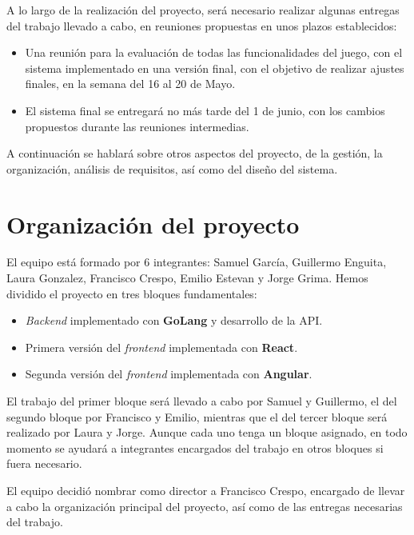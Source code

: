 \documentclass[11pt, a4paper, titlepage]{article}
\begin{document}
A lo largo de la realización del proyecto, será necesario realizar algunas entregas del trabajo llevado a cabo, en reuniones propuestas en unos plazos establecidos:

\begin{itemize}
    \item Una reunión para la evaluación de todas las funcionalidades del juego, con el sistema implementado en una versión final, con el objetivo de realizar ajustes finales, en la semana del 16 al 20 de Mayo.
    \item El sistema final se entregará no más tarde del 1 de junio, con los cambios propuestos durante las reuniones intermedias.
\end{itemize}

A continuación se hablará sobre otros aspectos del proyecto, de la gestión, la organización, análisis de requisitos, así como del diseño del sistema.

\section{Organización del proyecto}
El equipo está formado por 6 integrantes: Samuel García, Guillermo Enguita, Laura Gonzalez, Francisco Crespo, Emilio Estevan y Jorge Grima.
Hemos dividido el proyecto en tres bloques fundamentales:\newline
\begin{itemize}
    \item \textit{Backend} implementado con \textbf{GoLang} y desarrollo de la API.
    \item Primera versión del \textit{frontend} implementada con \textbf{React}.
    \item Segunda versión del \textit{frontend} implementada con \textbf{Angular}.\newline
\end{itemize}

El trabajo del primer bloque será llevado a cabo por Samuel y Guillermo, el del segundo bloque por Francisco y Emilio, mientras que el del tercer bloque será realizado por Laura y Jorge. 
Aunque cada uno tenga un bloque asignado, en todo momento se ayudará a integrantes encargados del trabajo en otros bloques si fuera necesario. \newline

El equipo decidió nombrar como director a Francisco Crespo, encargado de llevar a cabo la organización principal del proyecto, así como de las entregas necesarias del trabajo.
\end{document}
